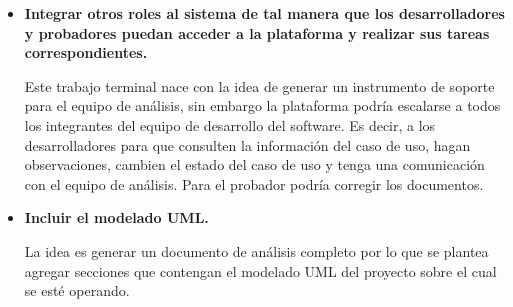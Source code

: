 \begin{itemize}
    \item \textbf {Integrar otros roles al sistema de tal manera que los desarrolladores y probadores puedan acceder a la plataforma y realizar sus tareas correspondientes.}
	
	Este trabajo terminal nace con la idea de generar un instrumento de soporte para el equipo de análisis, sin embargo la plataforma podría escalarse a todos los integrantes del equipo de desarrollo del software. Es decir, a los desarrolladores para que consulten la información del caso de uso, hagan observaciones, cambien el estado del caso de uso y tenga una comunicación con el equipo de análisis. Para el probador podría corregir los documentos.
	
	\item \textbf {Incluir el modelado UML.}
	
  	La idea es generar un documento de análisis completo por lo que se plantea agregar secciones que contengan el modelado UML del proyecto sobre el cual se esté operando. 
\end{itemize}
 